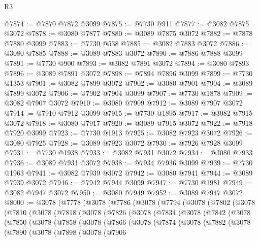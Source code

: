 \begin{lexlean}{R3}
\begin{coremodule}
@7874 := @7870 @7872 @3099
@7875 := @7730 @911
@7877 := @3082 @7875 @3072
@7878 := @3080 @7877
@7880 := @3089 @7875 @3072
@7882 := @7878 @7880 @3099
@7883 := @7730 @538
@7885 := @3082 @7883 @3072
@7886 := @3080 @7885
@7888 := @3089 @7883 @3072
@7890 := @7886 @7888 @3099
@7891 := @7730 @900
@7893 := @3082 @7891 @3072
@7894 := @3080 @7893
@7896 := @3089 @7891 @3072
@7898 := @7894 @7896 @3099
@7899 := @7730 @1353
@7901 := @3082 @7899 @3072
@7902 := @3080 @7901
@7904 := @3089 @7899 @3072
@7906 := @7902 @7904 @3099
@7907 := @7730 @1878
@7909 := @3082 @7907 @3072
@7910 := @3080 @7909
@7912 := @3089 @7907 @3072
@7914 := @7910 @7912 @3099
@7915 := @7730 @1895
@7917 := @3082 @7915 @3072
@7918 := @3080 @7917
@7920 := @3089 @7915 @3072
@7922 := @7918 @7920 @3099
@7923 := @7730 @1913
@7925 := @3082 @7923 @3072
@7926 := @3080 @7925
@7928 := @3089 @7923 @3072
@7930 := @7926 @7928 @3099
@7931 := @7730 @1938
@7933 := @3082 @7931 @3072
@7934 := @3080 @7933
@7936 := @3089 @7931 @3072
@7938 := @7934 @7936 @3099
@7939 := @7730 @1963
@7941 := @3082 @7939 @3072
@7942 := @3080 @7941
@7944 := @3089 @7939 @3072
@7946 := @7942 @7944 @3099
@7947 := @7730 @1981
@7949 := @3082 @7947 @3072
@7950 := @3080 @7949
@7952 := @3089 @7947 @3072
@8000 := @3078
    (@7778
      (@3078
        (@7786
          (@3078
            (@7794
              (@3078
                (@7802
                  (@3078
                    (@7810
                      (@3078
                        (@7818
                          (@3078
                            (@7826
                              (@3078
                                (@7834
                                  (@3078
                                    (@7842
                                      (@3078
                                        (@7850
                                          (@3078
                                            (@7858
                                              (@3078
                                                (@7866
                                                  (@3078
                                                    (@7874
                                                      (@3078
                                                        (@7882
                                                          (@3078
                                                            (@7890
                                                              (@3078
                                                                (@7898
                                                                  (@3078
                                                                    (@7906

\end{coremodule}
\end{lexlean}
